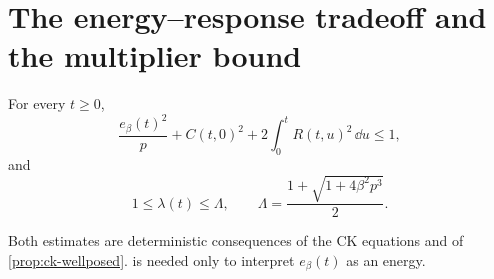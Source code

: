 \section{The energy--response tradeoff and the multiplier bound}\label{sec:uniform-bounds}

\begin{proposition}\label{prop:uniform-bounds}
For every $t\ge0$,
\begin{equation}
\frac{e_\beta(t)^2}{p}+C(t,0)^2
                +2\int_0^tR(t,u)^2\,\dd u\le1,
\label{eq:energy-response-tradeoff}
\end{equation}
and
\begin{equation}
1\le\lambda(t)\le
\Lambda,\qquad\Lambda=\frac{1+\sqrt{1+4\beta^2p^3}}2.
\label{eq:uniform-multiplier}
\end{equation}
\end{proposition}

Both estimates are deterministic consequences of the CK equations and of \cref{prop:ck-wellposed}.  is needed only to interpret $e_\beta(t)$ as an energy.

